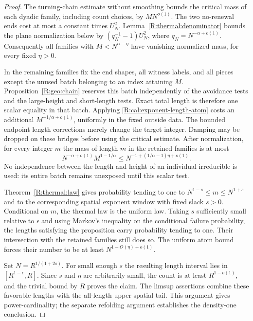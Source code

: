 \begin{proof}
The turning-chain estimate without smoothing bounds the critical mass of
each dyadic family, including count choices, by $MN^{o(1)}$. The two
no-renewal ends cost at most a constant times $U_N^2$. Lemma~\ref{R:thermal:denominator} bounds the plane
normalization below by
$(q_N^{-1}-1)U_N^2$, where $q_N=N^{-\alpha+o(1)}$. Consequently all
families with $M<N^{\alpha-\eta}$ have vanishing normalized mass, for every
fixed $\eta>0$.

In the remaining families fix the end shapes, all witness labels, and all
pieces except the unused batch belonging to an index attaining $M$.
Proposition~\ref{R:geo:chain} reserves this batch independently of the
avoidance tests and the large-height and short-length tests. Exact total
length is therefore one scalar equality in that batch. Applying
\eqref{R:cal:exponent-length-atom} costs an additional
$M^{-1/\alpha+o(1)}$, uniformly in the fixed outside data. The bounded
endpoint length corrections merely change the target integer. Damping may
be dropped on these bridges before using the critical estimate. After
normalization, for every integer $m$ the mass of length $m$ in the retained
families is at most
\[
 N^{-\alpha+o(1)}M^{1-1/\alpha}
 \le N^{-1+(1/\alpha-1)\eta+o(1)}.
\]
No independence between the length and height of an individual irreducible
is used: its entire batch remains unexposed until this scalar test.

Theorem~\ref{R:thermal:law} gives probability tending to one
to $N^{1-s}\le m\le N^{1+s}$ and to the corresponding spatial exponent
window with fixed slack $s>0$. Conditional on $m$, the thermal law is the
uniform law. Taking $s$ sufficiently small relative to $\epsilon$ and
using Markov's inequality on the conditional failure probability, the
lengths satisfying the proposition carry probability tending to one.
Their intersection with the retained families still does so. The uniform
atom bound forces their number to be at least
$N^{1-O(\eta)+o(1)}$.

Set $N=R^{1/(1+2s)}$. For small enough $s$ the resulting length interval
lies in $[R^{1-\epsilon},R]$. Since $s$ and $\eta$ are arbitrarily small,
the count is at least $R^{1-o(1)}$, and the trivial bound by $R$ proves the
claim. The limsup assertions combine these favorable lengths with the
all-length upper spatial tail. This argument gives power-cardinality;
the separate refolding argument establishes the density-one conclusion.
\end{proof}
